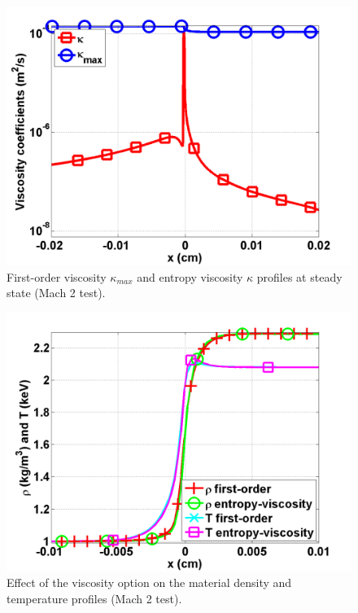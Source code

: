 \documentclass[review]{elsarticle}
\begin{document}
\begin{figure}[H]
                \centering
                \includegraphics[width=\textwidth]{figs/Mach_2_nel_2000_viscosity.png}
        \caption{First-order viscosity $\kappa_{max}$ and entropy viscosity $\kappa$ profiles at steady state (Mach 2 test).}\label{fig:Mach2_viscosity}
\end{figure}
\begin{figure}[H]
                \centering
                \includegraphics[width=\textwidth]{figs/Mach_2_fo_ev.png}
        \caption{Effect of the viscosity option on the material density and temperature profiles (Mach 2 test).}\label{fig:Mach2_tempEVandFO}
\end{figure}
\end{document}
